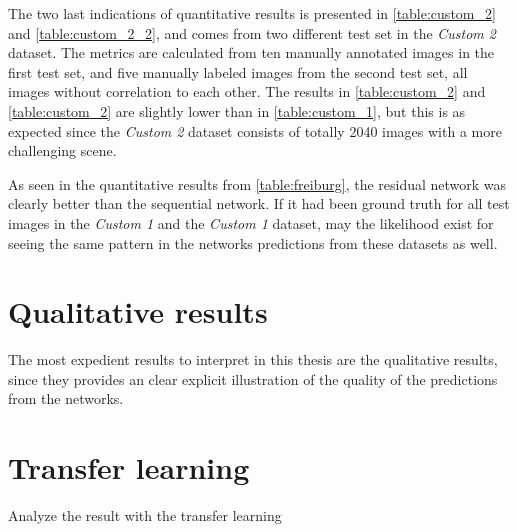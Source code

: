 \documentclass[USenglish]{ifimaster}  %
\begin{document}
The two last indications of quantitative results is presented in \cref{table:custom_2} and \cref{table:custom_2_2}, and comes from two different test set in the \textit{Custom 2} dataset. The metrics are calculated from ten manually annotated images in the first test set, and five manually labeled images from the second test set, all images without correlation to each other. The results in \cref{table:custom_2} and \cref{table:custom_2} are slightly lower than in \cref{table:custom_1}, but this is as expected since the \textit{Custom 2} dataset consists of totally 2040 images with a more challenging scene. 

As seen in the quantitative results from \cref{table:freiburg}, the residual network was clearly better than the sequential network. If it had been ground truth for all test images in the \textit{Custom 1} and the \textit{Custom 1} dataset, may the likelihood exist for seeing the same pattern in the networks predictions from these datasets as well.



\section{Qualitative results}
The most expedient results to interpret in this thesis are the qualitative results, since they provides an clear explicit illustration of the quality of the predictions from the networks. 



\section{Transfer learning}
Analyze the result with the transfer learning
\end{document}
